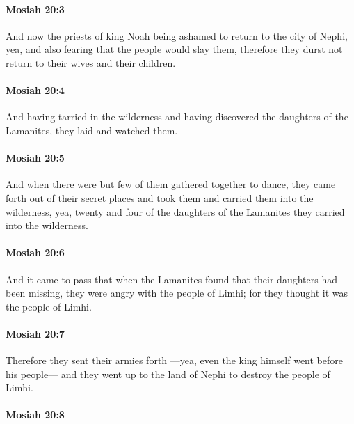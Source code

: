 		\paragraph{Mosiah 20:3} %
			\label{MOSIAH-20-3}

			And now the priests of king Noah being ashamed to return to the city of Nephi,
			yea, and also fearing that the people would slay them,
			therefore they durst not return to their wives and their children.

		\paragraph{Mosiah 20:4} %
			\label{MOSIAH-20-4}

			And having tarried in the wilderness
			and having discovered the daughters of the Lamanites,
			they laid and watched them.

		\paragraph{Mosiah 20:5} %
			\label{MOSIAH-20-5}

			And when there were but few of them gathered together to dance,
			they came forth out of their secret places
			and took them and carried them into the wilderness,
			yea, twenty and four of the daughters of the Lamanites
			they carried into the wilderness.

		\paragraph{Mosiah 20:6} %
			\label{MOSIAH-20-6}

			And it came to pass that when the Lamanites found
			that their daughters had been missing,
			they were angry with the people of Limhi;
			for they thought it was the people of Limhi.

		\paragraph{Mosiah 20:7} %
			\label{MOSIAH-20-7}

			Therefore they sent their armies forth
			---yea, even the king himself went before his people---
			and they went up to the land of Nephi to destroy the people of Limhi.

		\paragraph{Mosiah 20:8} %
			\label{MOSIAH-20-8}

